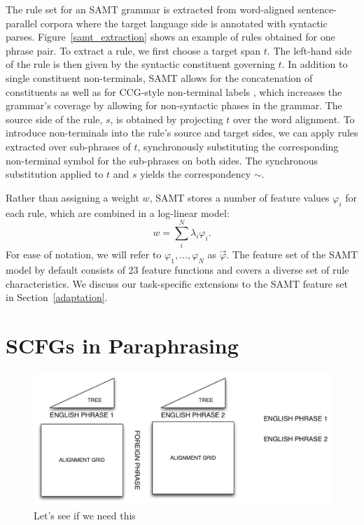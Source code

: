 \documentclass[11pt]{article}
\newcommand{\mnote}[1]{\marginpar{%
  \vskip-\baselineskip
  \raggedright\footnotesize
  \itshape\hrule\smallskip\footnotesize{#1}\par\smallskip\hrule}}
\begin{document}
The rule set for an SAMT grammar is extracted from word-aligned
sentence-parallel corpora where the target language side is annotated
with syntactic parses. Figure~\ref{samt_extraction} shows an example
of rules obtained for one phrase pair. To extract a rule, we first
choose a target span $t$. The left-hand side of the rule is then given
by the syntactic constituent governing $t$. In addition to single
constituent non-terminals, SAMT allows for the concatenation of
constituents as well as for CCG-style non-terminal labels
\cite{Steedman1999}, which increases the grammar's coverage by
allowing for non-syntactic phases in the grammar. The source side of
the rule, $s$, is obtained by projecting $t$ over the word
alignment. To introduce non-terminals into the rule's source and
target sides, we can apply rules extracted over sub-phrases of $t$,
synchronously substituting the corresponding non-terminal symbol for
the sub-phrases on both sides. \mnote{Tie this back to $\alpha$ and
  $\gamma$?} The synchronous substitution applied to $t$ and $s$
yields the correspondency $\sim$.

Rather than assigning a weight $w$, SAMT stores a number of feature
values $\varphi_i$ for each rule, which are combined in a log-linear
model:
\begin{equation}
  w = \sum_i^N \lambda_i \varphi_i .
\end{equation}
For ease of notation, we will refer to $\varphi_1, \ldots ,\varphi_N$
as $\vec{\varphi}$. The feature set of the SAMT model by default
consists of 23 feature functions and covers a diverse set of rule
characteristics. We discuss our task-specific extensions to the SAMT
feature set in Section~\ref{adaptation}.

\section{SCFGs in Paraphrasing} \label{acquisition}

\begin{figure}[!t]
\begin{center}
\includegraphics[width=0.99\linewidth]{figures/pivot.pdf}
\end{center}
\caption{Let's see if we need this}
\end{figure}
\end{document}
